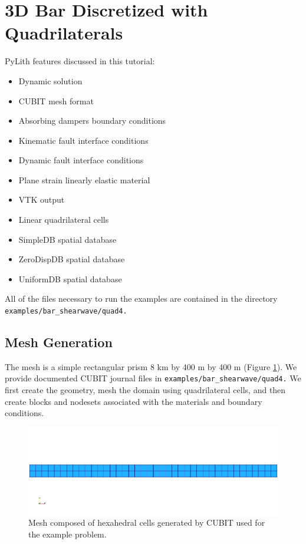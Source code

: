 
\section{\label{sec:tutorial:shearwave:quad4}3D Bar Discretized with Quadrilaterals}

PyLith features discussed in this tutorial:
\begin{itemize}
\item Dynamic solution
\item CUBIT mesh format
\item Absorbing dampers boundary conditions
\item Kinematic fault interface conditions
\item Dynamic fault interface conditions
\item Plane strain linearly elastic material
\item VTK output
\item Linear quadrilateral cells
\item SimpleDB spatial database
\item ZeroDispDB spatial database
\item UniformDB spatial database
\end{itemize}
All of the files necessary to run the examples are contained in the
directory \texttt{examples/bar\_shearwave/quad4.}


\subsection{Mesh Generation}

The mesh is a simple rectangular prism 8 km by 400 m by 400 m (Figure
\ref{fig:shearwave:quad4:mesh}). We provide documented CUBIT journal
files in \texttt{examples/bar\_shearwave/quad4.} We first create the
geometry, mesh the domain using quadrilateral cells, and then create
blocks and nodesets associated with the materials and boundary conditions.

\noindent \begin{center}
\begin{figure}
\begin{centering}
\includegraphics[scale=0.5]{tutorials/shearwave/figs/quad4mesh}
\par\end{centering}

\caption{Mesh composed of hexahedral cells generated by CUBIT used for the
example problem.\label{fig:shearwave:quad4:mesh}}
\end{figure}

\par\end{center}


